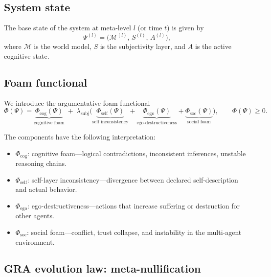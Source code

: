 \documentclass[11pt,a4paper]{article}
\begin{document}
\subsection{System state}

The base state of the system at meta-level $l$ (or time $t$) is given by
\begin{equation}
\Psi^{(l)} = \big( \mathcal{M}^{(l)},\, S^{(l)},\, A^{(l)} \big),
\end{equation}
where $\mathcal{M}$ is the world model, $S$ is the subjectivity layer, and $A$ is the active cognitive state.

\subsection{Foam functional}

We introduce the argumentative foam functional
\begin{equation}
\Phi(\Psi) =
\underbrace{\Phi_{\text{cog}}(\Psi)}_{\text{cognitive foam}}
\;+\;
\lambda_{\text{subj}}\Big(
\underbrace{\Phi_{\text{self}}(\Psi)}_{\text{self inconsistency}}
+
\underbrace{\Phi_{\text{ego}}(\Psi)}_{\text{ego-destructiveness}}
+
\underbrace{\Phi_{\text{soc}}(\Psi)}_{\text{social foam}}
\Big),
\qquad
\Phi(\Psi)\ge 0.
\end{equation}

The components have the following interpretation:
\begin{itemize}
\item $\Phi_{\text{cog}}$: cognitive foam---logical contradictions, inconsistent inferences, unstable reasoning chains.
\item $\Phi_{\text{self}}$: self-layer inconsistency---divergence between declared self-description and actual behavior.
\item $\Phi_{\text{ego}}$: ego-destructiveness---actions that increase suffering or destruction for other agents.
\item $\Phi_{\text{soc}}$: social foam---conflict, trust collapse, and instability in the multi-agent environment.
\end{itemize}

\subsection{GRA evolution law: meta-nullification}
\end{document}
